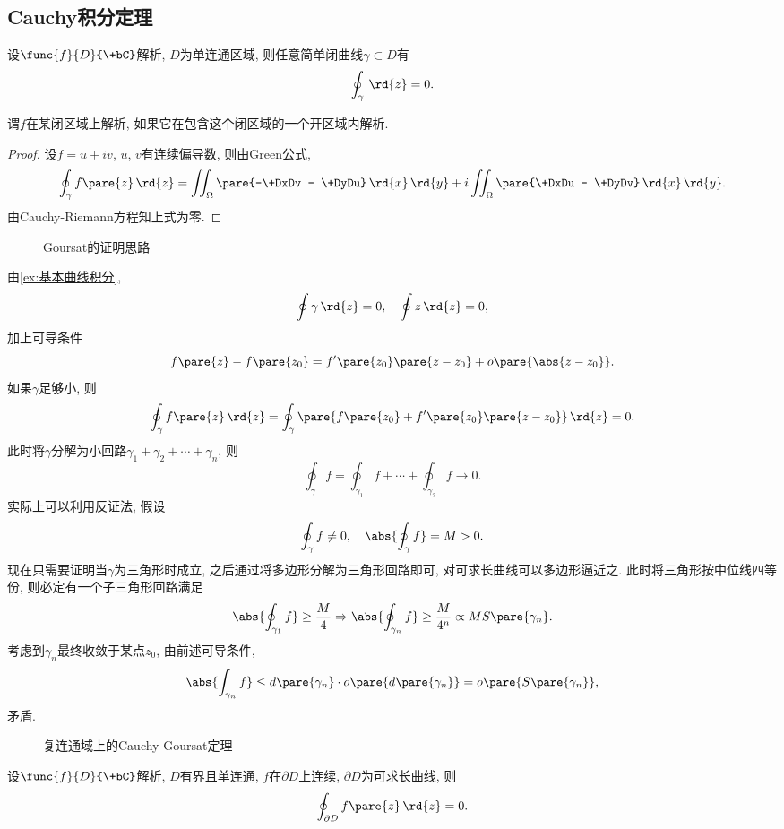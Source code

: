 \documentclass{ctexart}
\begin{document}
\subsection{Cauchy积分定理} %
\label{sub:cauchy积分定理}

\begin{theorem}
    设$\func{f}{D}{\+bC}$解析, $D$为单连通区域, 则任意简单闭曲线$\gamma\subset D$有
    \[ \oint_\gamma \,\rd{z} = 0. \]
\end{theorem}
\begin{remark}
    谓$f$在某闭区域上解析, 如果它在包含这个闭区域的一个开区域内解析.
\end{remark}
\begin{proof}
    设$f=u+iv$, $u$, $v$有连续偏导数, 则由Green公式,
    \[ \oint_\gamma f\pare{z}\,\rd{z} = \iint_\Omega \pare{-\+DxDv - \+DyDu}\,\rd{x}\,\rd{y} + i\iint_\Omega \pare{\+DxDu - \+DyDv} \,\rd{x}\,\rd{y}. \]
    由Cauchy-Riemann方程知上式为零.
\end{proof}
\begin{figure}[ht]
    \centering
    \caption{Goursat的证明思路}
    \label{fig:Goursat的证明思路}
\end{figure}
由\cref{ex:基本曲线积分},
\[ \oint\gamma\,\rd{z} = 0,\quad \oint z\,\rd{z} = 0, \]
加上可导条件
\[ f\pare{z} - f\pare{z_0} = f'\pare{z_0}\pare{z-z_0} + o\pare{\abs{z-z_0}}. \]
如果$\gamma$足够小, 则
\[ \oint_\gamma f\pare{z}\,\rd{z} = \oint_\gamma \pare{f\pare{z_0} + f'\pare{z_0}\pare{z-z_0}}\,\rd{z} = 0. \]
此时将$\gamma$分解为小回路$\gamma_1 + \gamma_2 + \cdots + \gamma_n$, 则
\[ \oint_\gamma f  = \oint_{\gamma_1} f + \cdots + \oint_{\gamma_2} f \rightarrow 0. \]
实际上可以利用反证法, 假设
\[ \oint_\gamma f \neq 0,\quad \abs{\oint_\gamma f} = M > 0. \]
现在只需要证明当$\gamma$为三角形时成立, 之后通过将多边形分解为三角形回路即可, 对可求长曲线可以多边形逼近之. 此时将三角形按中位线四等份, 则必定有一个子三角形回路满足
\[ \abs{\oint_{\gamma_1} f} \ge \frac{M}{4}\Rightarrow \abs{\oint_{\gamma_n} f} \ge \frac{M}{4^n} \propto MS\pare{\gamma_n}. \]
考虑到$\gamma_n$最终收敛于某点$z_0$, 由前述可导条件,
\[ \abs{\int_{\gamma_n} f} \le d\pare{\gamma_n}\cdot o\pare{d\pare{\gamma_n}} = o\pare{S\pare{\gamma_n}}, \]
矛盾.
\begin{figure}[ht]
    \centering
    \caption{复连通域上的Cauchy-Goursat定理}
    \label{fig:复连通域上的Cauchy-Goursat定理}
\end{figure}
\begin{theorem}
    设$\func{f}{D}{\+bC}$解析, $D$有界且单连通, $f$在$\partial D$上连续, $\partial D$为可求长曲线, 则
    \[ \oint_{\partial D} f\pare{z}\,\rd{z} = 0. \]
\end{theorem}
\end{document}
